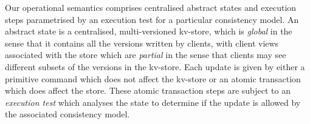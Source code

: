 





Our operational semantics comprises centralised abstract states
 and
execution steps parametrised by an execution test for a particular
consistency model.
An abstract  state is a
centralised, multi-versioned kv-store, which is {\em global} in the
sense that it contains all the versions written by clients, with
client views associated with the  store 
which are {\em partial} in the sense that clients may see different 
subsets of the versions in the kv-store. Each update is given by either
a primitive command which does not affect the kv-store or an atomic
transaction which does affect the store. These atomic
transaction steps are subject to an {\em execution test} which
analyses the state to determine if the update is allowed by 
the associated consistency model. 


